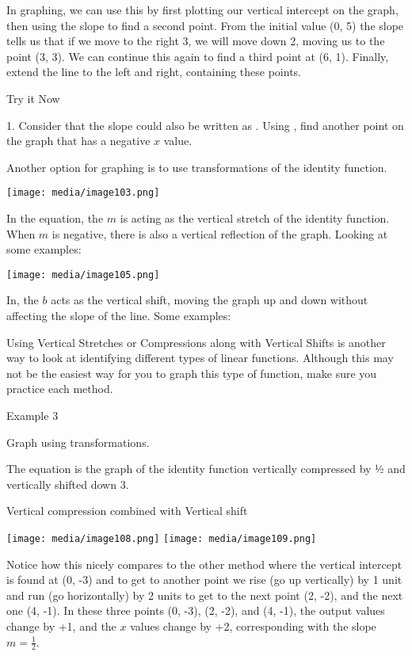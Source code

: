 In graphing, we can use this by first plotting our vertical intercept on
the graph, then using the slope to find a second point. From the initial
value (0, 5) the slope tells us that if we move to the right 3, we will
move down 2, moving us to the point (3, 3). We can continue this again
to find a third point at (6, 1). Finally, extend the line to the left
and right, containing these points.

Try it Now

1. Consider that the slope could also be written as . Using , find
another point on the graph that has a negative $x$ value.

Another option for graphing is to use transformations of the identity
function.

\texttt{[image: media/image103.png]}

In the equation, the $m$ is acting as the vertical stretch of the
identity function. When $m$ is negative, there is also a vertical
reflection of the graph. Looking at some examples:

\texttt{[image: media/image105.png]}

In, the $b$ acts as the vertical shift, moving the graph up and
down without affecting the slope of the line. Some examples:

Using Vertical Stretches or Compressions along with Vertical Shifts is
another way to look at identifying different types of linear functions.
Although this may not be the easiest way for you to graph this type of
function, make sure you practice each method.

Example 3

Graph using transformations.

The equation is the graph of the identity function vertically compressed
by ½ and vertically shifted down 3.

Vertical compression combined with Vertical shift

\texttt{[image: media/image108.png]}
\texttt{[image: media/image109.png]}

Notice how this nicely compares to the other method where the vertical
intercept is found at (0, -3) and to get to another point we rise (go up
vertically) by 1 unit and run (go horizontally) by 2 units to get to the
next point (2, -2), and the next one (4, -1). In these three points (0,
-3), (2, -2), and (4, -1), the output values change by +1, and the
$x$ values change by +2, corresponding with the slope $m = \frac{1}{2}$.

